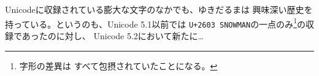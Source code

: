 

\showversion
Unicodeに収録されている膨大な文字のなかでも、ゆきだるまは
興味深い歴史を持っている。というのも、Unicode 5.1以前では
\texttt{U+2603 SNOWMAN}の一点のみ\footnote{字形の差異は
すべて包摂されていたことになる。}の収録であったのに対し、
Unicode 5.2において新たに…

